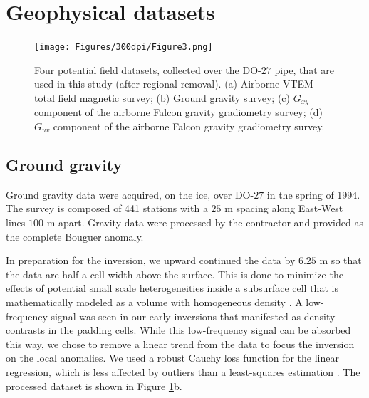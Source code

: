 \documentclass[paper, twocolumn]{geophysics} %
\begin{document}
\section{Geophysical datasets}


\begin{figure}[!ht]%
\centering
\texttt{[image: Figures/300dpi/Figure3.png]}
\caption{Four potential field datasets, collected over the DO-$27$ pipe, that are used in this study (after regional removal). (a) Airborne VTEM total field magnetic survey; (b) Ground gravity survey; (c) $G_{xy}$ component of the airborne Falcon gravity gradiometry survey; (d) $G_{uv}$ component of the airborne Falcon gravity gradiometry survey.}
\label{fig:Figure3.png}
\end{figure}%


\subsection{Ground gravity}

Ground gravity data were acquired, on the ice, over DO-$27$ in the spring of 1994. The survey is composed of 441 stations with a $25$ m spacing along East-West lines $100$ m apart. Gravity data were processed by the contractor and provided as the complete Bouguer anomaly.

In preparation for the inversion, we upward continued the data by $6.25$ m so that the data are half a cell width above the surface. This is done to minimize the effects of potential small scale heterogeneities inside a subsurface cell that is mathematically modeled as a volume with homogeneous density \citep{Li1996}. A low-frequency signal was seen in our early inversions that manifested as density contrasts in the padding cells. While this low-frequency signal can be absorbed this way, we chose to remove a linear trend from the data to focus the inversion on the local anomalies. We used a robust Cauchy loss function for the linear regression, which is less affected by outliers than a least-squares estimation \citep{CauchyNorm}. The processed dataset is shown in Figure \ref{fig:Figure3.png}b.
\end{document}
